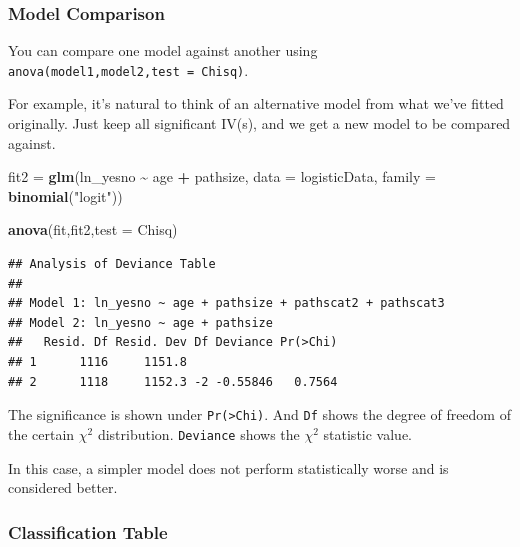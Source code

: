 \documentclass[
]{ctexart}
\newenvironment{Shaded}{\begin{snugshade}}{\end{snugshade}}
\newcommand{\AttributeTok}[1]{\textcolor[rgb]{0.13,0.29,0.53}{#1}}
\newcommand{\FunctionTok}[1]{\textcolor[rgb]{0.13,0.29,0.53}{\textbf{#1}}}
\newcommand{\NormalTok}[1]{#1}
\newcommand{\OtherTok}[1]{\textcolor[rgb]{0.56,0.35,0.01}{#1}}
\newcommand{\SpecialCharTok}[1]{\textcolor[rgb]{0.81,0.36,0.00}{\textbf{#1}}}
\newcommand{\StringTok}[1]{\textcolor[rgb]{0.31,0.60,0.02}{#1}}
\begin{document}
\hypertarget{model-comparison}{%
\subsubsection{Model Comparison}\label{model-comparison}}

You can compare one model against another using
\texttt{anova(model1,model2,test\ =\ \textquotesingle{}Chisq\textquotesingle{})}.

For example, it's natural to think of an alternative model from what
we've fitted originally. Just keep all significant IV(s), and we get a
new model to be compared against.

\begin{Shaded}
\begin{Highlighting}[]
\NormalTok{fit2 }\OtherTok{=} \FunctionTok{glm}\NormalTok{(ln\_yesno }\SpecialCharTok{\textasciitilde{}}\NormalTok{ age }\SpecialCharTok{+}\NormalTok{ pathsize,}
           \AttributeTok{data =}\NormalTok{ logisticData,}
           \AttributeTok{family =} \FunctionTok{binomial}\NormalTok{(}\StringTok{"logit"}\NormalTok{))}
\end{Highlighting}
\end{Shaded}

\begin{Shaded}
\begin{Highlighting}[]
\FunctionTok{anova}\NormalTok{(fit,fit2,}\AttributeTok{test =} \StringTok{\textquotesingle{}Chisq\textquotesingle{}}\NormalTok{)}
\end{Highlighting}
\end{Shaded}

\begin{verbatim}
## Analysis of Deviance Table
## 
## Model 1: ln_yesno ~ age + pathsize + pathscat2 + pathscat3
## Model 2: ln_yesno ~ age + pathsize
##   Resid. Df Resid. Dev Df Deviance Pr(>Chi)
## 1      1116     1151.8                     
## 2      1118     1152.3 -2 -0.55846   0.7564
\end{verbatim}

The significance is shown under \texttt{Pr(\textgreater{}Chi)}. And
\texttt{Df} shows the degree of freedom of the certain \(\chi^2\)
distribution. \texttt{Deviance} shows the \(\chi^2\) statistic value.

In this case, a simpler model does not perform statistically worse and
is considered better.

\hypertarget{classification-table}{%
\subsubsection{Classification Table}\label{classification-table}}
\end{document}
